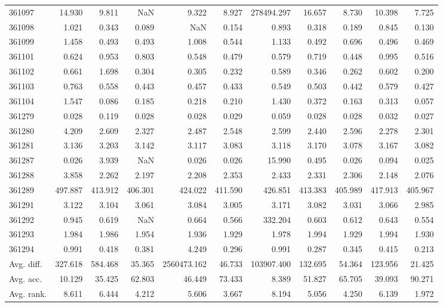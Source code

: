 \begin{tabular}{lrrrrrrrrrr}
361097 & 14.930 & 9.811 & NaN & 9.322 & 8.927 & 278494.297 & 16.657 & 8.730 & 10.398 & 7.725 \\
361098 & 1.021 & 0.343 & 0.089 & NaN & 0.154 & 0.893 & 0.318 & 0.189 & 0.845 & 0.130 \\
361099 & 1.458 & 0.493 & 0.493 & 1.008 & 0.544 & 1.133 & 0.492 & 0.696 & 0.496 & 0.469 \\
361101 & 0.624 & 0.953 & 0.803 & 0.548 & 0.479 & 0.579 & 0.719 & 0.448 & 0.995 & 0.516 \\
361102 & 0.661 & 1.698 & 0.304 & 0.305 & 0.232 & 0.589 & 0.346 & 0.262 & 0.602 & 0.200 \\
361103 & 0.763 & 0.558 & 0.443 & 0.457 & 0.433 & 0.549 & 0.503 & 0.442 & 0.579 & 0.427 \\
361104 & 1.547 & 0.086 & 0.185 & 0.218 & 0.210 & 1.430 & 0.372 & 0.163 & 0.313 & 0.057 \\
361279 & 0.028 & 0.119 & 0.028 & 0.028 & 0.029 & 0.059 & 0.028 & 0.028 & 0.032 & 0.027 \\
361280 & 4.209 & 2.609 & 2.327 & 2.487 & 2.548 & 2.599 & 2.440 & 2.596 & 2.278 & 2.301 \\
361281 & 3.136 & 3.203 & 3.142 & 3.117 & 3.083 & 3.118 & 3.170 & 3.078 & 3.167 & 3.082 \\
361287 & 0.026 & 3.939 & NaN & 0.026 & 0.026 & 15.990 & 0.495 & 0.026 & 0.094 & 0.025 \\
361288 & 3.858 & 2.262 & 2.197 & 2.208 & 2.353 & 2.433 & 2.331 & 2.306 & 2.148 & 2.076 \\
361289 & 497.887 & 413.912 & 406.301 & 424.022 & 411.590 & 426.851 & 413.383 & 405.989 & 417.913 & 405.967 \\
361291 & 3.122 & 3.104 & 3.061 & 3.084 & 3.005 & 3.171 & 3.082 & 3.031 & 3.066 & 2.985 \\
361292 & 0.945 & 0.619 & NaN & 0.664 & 0.566 & 332.204 & 0.603 & 0.612 & 0.643 & 0.554 \\
361293 & 1.984 & 1.986 & 1.954 & 1.936 & 1.929 & 1.978 & 1.994 & 1.929 & 1.994 & 1.930 \\
361294 & 0.991 & 0.418 & 0.381 & 4.249 & 0.296 & 0.991 & 0.287 & 0.345 & 0.415 & 0.213 \\
Avg. diff. & 327.618 & 584.468 & 35.365 & 2560473.162 & 46.733 & 103907.400 & 132.695 & 54.364 & 123.956 & 21.425 \\
Avg. acc. & 10.129 & 35.425 & 62.803 & 46.449 & 73.433 & 8.389 & 51.827 & 65.705 & 39.093 & 90.271 \\
Avg. rank. & 8.611 & 6.444 & 4.212 & 5.606 & 3.667 & 8.194 & 5.056 & 4.250 & 6.139 & 1.972 \\
\bottomrule
\end{tabular}
